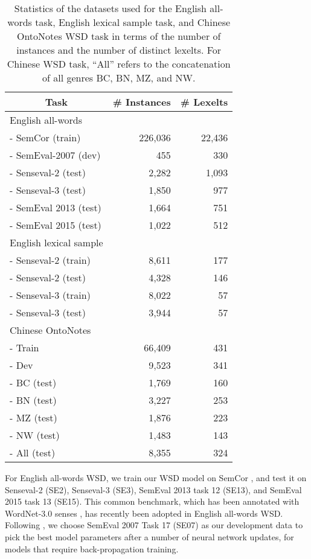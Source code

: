 \documentclass[11pt,a4paper]{article}
\begin{document}
\begin{table}
\small
\centering
\begin{tabular}{|l|r|r|}
\hline
\multicolumn{1}{|c|}{\textbf{Task}} & \multicolumn{1}{c|}{\textbf{\# Instances}} & \multicolumn{1}{c|}{\textbf{\# Lexelts}} \\
\hline
English all-words & & \\
- SemCor (train) & 226,036 & 22,436 \\
- SemEval-2007 (dev) & 455   & 330 \\
- Senseval-2 (test) & 2,282 & 1,093 \\
- Senseval-3 (test) & 1,850 & 977 \\
- SemEval 2013 (test) & 1,664 & 751 \\
- SemEval 2015 (test) & 1,022 & 512 \\
\hline
English lexical sample &       &  \\
- Senseval-2 (train) & 8,611 & 177 \\
- Senseval-2 (test) & 4,328 & 146 \\
- Senseval-3 (train) & 8,022 & 57 \\
- Senseval-3 (test) & 3,944 & 57 \\
\hline
Chinese OntoNotes &       &  \\
- Train & 66,409 & 431 \\
- Dev  & 9,523 & 341 \\
- BC (test) & 1,769 & 160 \\
- BN (test) & 3,227 & 253 \\
- MZ (test) & 1,876 & 223 \\
- NW (test) & 1,483 & 143 \\
- All (test) & 8,355 & 324 \\
\hline
\end{tabular}
\caption{\label{tab:data} Statistics of the datasets used for the English all-words task, English lexical sample task, and Chinese OntoNotes WSD task in terms of the number of instances and the number of distinct lexelts. For Chinese WSD task, ``All'' refers to the concatenation of all genres BC, BN, MZ, and NW.}
\end{table} 
For English all-words WSD, we train our WSD model on SemCor \cite{miller_using_1994}, and test it on Senseval-2 (SE2), Senseval-3 (SE3), SemEval 2013 task 12 (SE13), and SemEval 2015 task 13 (SE15). This common benchmark, which has been annotated with WordNet-3.0 senses \cite{raganato_word_2017}, has recently been adopted in English all-words WSD. Following \cite{raganato_neural_2017}, we choose SemEval 2007 Task 17 (SE07) as our development data to pick the best model parameters after a number of neural network updates, for models that require back-propagation training.
\end{document}
